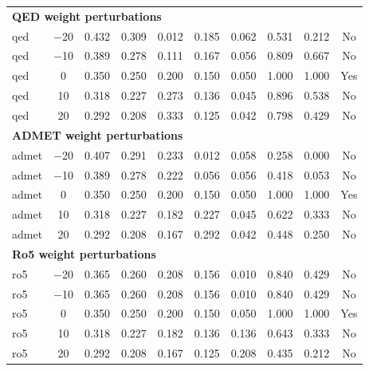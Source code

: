 \documentclass[journal=jcisd8,manuscript=suppinfo]{achemso}
\begin{document}
\begin{table}[htbp]
\begin{tabular}{lccccccccc}
\midrule
\multicolumn{10}{l}{\textbf{QED weight perturbations}} \\
qed & \num{-20} & \num{0.432} & \num{0.309} & \num{0.012} & \num{0.185} & \num{0.062} & \num{0.531} & \num{0.212} & No \\
qed & \num{-10} & \num{0.389} & \num{0.278} & \num{0.111} & \num{0.167} & \num{0.056} & \num{0.809} & \num{0.667} & No \\
qed & \num{0} & \num{0.350} & \num{0.250} & \num{0.200} & \num{0.150} & \num{0.050} & \num{1.000} & \num{1.000} & Yes \\
qed & \num{+10} & \num{0.318} & \num{0.227} & \num{0.273} & \num{0.136} & \num{0.045} & \num{0.896} & \num{0.538} & No \\
qed & \num{+20} & \num{0.292} & \num{0.208} & \num{0.333} & \num{0.125} & \num{0.042} & \num{0.798} & \num{0.429} & No \\
\midrule
\multicolumn{10}{l}{\textbf{ADMET weight perturbations}} \\
admet & \num{-20} & \num{0.407} & \num{0.291} & \num{0.233} & \num{0.012} & \num{0.058} & \num{0.258} & \num{0.000} & No \\
admet & \num{-10} & \num{0.389} & \num{0.278} & \num{0.222} & \num{0.056} & \num{0.056} & \num{0.418} & \num{0.053} & No \\
admet & \num{0} & \num{0.350} & \num{0.250} & \num{0.200} & \num{0.150} & \num{0.050} & \num{1.000} & \num{1.000} & Yes \\
admet & \num{+10} & \num{0.318} & \num{0.227} & \num{0.182} & \num{0.227} & \num{0.045} & \num{0.622} & \num{0.333} & No \\
admet & \num{+20} & \num{0.292} & \num{0.208} & \num{0.167} & \num{0.292} & \num{0.042} & \num{0.448} & \num{0.250} & No \\
\midrule
\multicolumn{10}{l}{\textbf{Ro5 weight perturbations}} \\
ro5 & \num{-20} & \num{0.365} & \num{0.260} & \num{0.208} & \num{0.156} & \num{0.010} & \num{0.840} & \num{0.429} & No \\
ro5 & \num{-10} & \num{0.365} & \num{0.260} & \num{0.208} & \num{0.156} & \num{0.010} & \num{0.840} & \num{0.429} & No \\
ro5 & \num{0} & \num{0.350} & \num{0.250} & \num{0.200} & \num{0.150} & \num{0.050} & \num{1.000} & \num{1.000} & Yes \\
ro5 & \num{+10} & \num{0.318} & \num{0.227} & \num{0.182} & \num{0.136} & \num{0.136} & \num{0.643} & \num{0.333} & No \\
ro5 & \num{+20} & \num{0.292} & \num{0.208} & \num{0.167} & \num{0.125} & \num{0.208} & \num{0.435} & \num{0.212} & No \\

\end{tabular}
\end{table}
\end{document}
